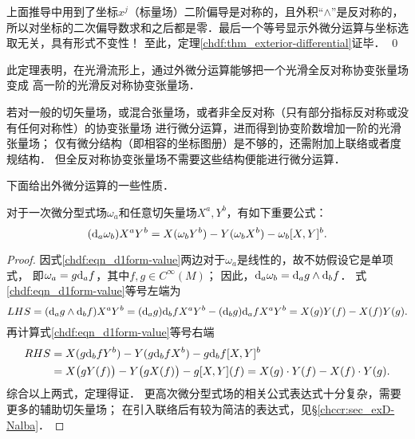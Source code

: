 上面推导中用到了坐标$x^j$（标量场）二阶偏导是对称的，且外积“$\wedge$”是反对称的，
所以对坐标的二次偏导数求和之后都是零．最后一个等号显示外微分运算与坐标选取无关，具有形式不变性！
至此，定理\ref{chdf:thm_exterior-differential}证毕． \qed
\begin{remark}
    此定理表明，在光滑流形上，通过外微分运算能够把一个光滑{\kaishu 全反对称协变}张量场变成
    {\kaishu 高一阶}的光滑反对称协变张量场．

    若对一般的切矢量场，或混合张量场，或者非全反对称（只有部分指标反对称或没有任何对称性）的协变张量场
    进行{\kaishu 微分}运算，进而得到协变阶数增加一阶的光滑张量场；
    仅有微分结构（即相容的坐标图册）是不够的，还需附加上联络或者度规结构．
    但{\kaishu 全反对称协变}张量场不需要这些结构便能进行{\kaishu 微分}运算．
\end{remark}

下面给出外微分运算的一些性质．


\begin{theorem}
对于一次微分型式场$\omega_a$和任意切矢量场$X^a,Y^b$，有如下重要公式：
\begin{equation}\label{chdf:eqn_d1form-value}
    ({\rm d}_a \omega_b) X^a Y^b = X(\omega_b Y^b)-Y(\omega_b X^b) -\omega_b [X,Y]^b .
\end{equation}
\end{theorem}
\begin{proof}
    因式\eqref{chdf:eqn_d1form-value}两边对于$\omega_a$是线性的，故不妨假设它是单项式，
       即$\omega_a = g {\rm d}_a f$，其中$f,g \in C^\infty(M)$；
    因此，${\rm d}_a \omega_b = {\rm d}_a g \wedge {\rm d}_b f$．
    式\eqref{chdf:eqn_d1form-value}等号左端为
    \setlength{\mathindent}{0em}
    \begin{equation*}
        LHS = ({\rm d}_a g \wedge {\rm d}_b f)X^a Y^b
        = ({\rm d}_a g) {\rm d}_b f  X^a Y^b -({\rm d}_b g) {\rm d}_a f X^a Y^b
        = X(g)  Y(f) - X(f)  Y(g) .
    \end{equation*}\setlength{\mathindent}{2em}
    再计算式\eqref{chdf:eqn_d1form-value}等号右端
    \begin{align*}
        RHS &= X(g {\rm d}_b f  Y^b)-Y(g {\rm d}_b f X^b) - g {\rm d}_b f  [X,Y]^b \\
        &= X\bigl(g  Y(f)\bigr)-Y\bigl(g X(f)\bigr) - g  [X,Y](f)
        = X(g) \cdot Y(f) - X(f) \cdot Y(g) .
    \end{align*}
    综合以上两式，定理得证．
    更高次微分型式场的相关公式表达式十分复杂，需要更多的辅助切矢量场；
    在引入联络后有较为简洁的表达式，见\S \ref{chccr:sec_exD-Nalba}．
\end{proof}

